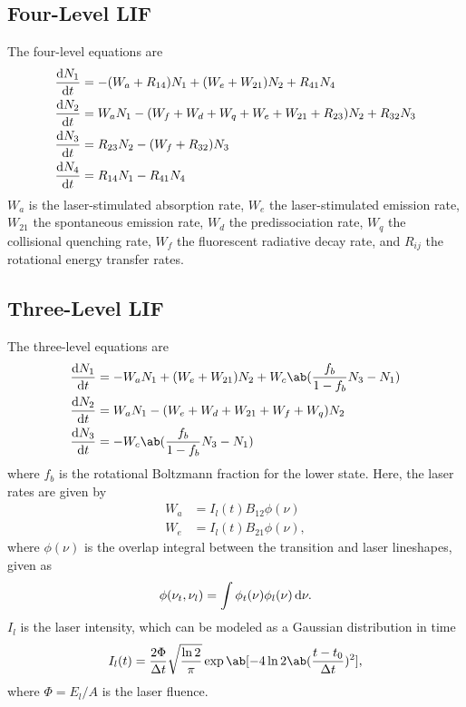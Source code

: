 \subsection{Four-Level LIF}

The four-level equations are \cite[18]{grinsteadTemperatureMeasurementHighTemperature1995}
\begin{align*}
    \odv{N_1}{t} & = -(W_a + R_{14})N_1 + (W_e + W_{21})N_2 + R_{41}N_4                      \\
    \odv{N_2}{t} & = W_aN_1 - (W_f + W_d + W_q + W_e + W_{21} + R_{23})N_2 + R_{32}N_3 \\
    \odv{N_3}{t} & = R_{23}N_2 - (W_f + R_{32})N_3                                               \\
    \odv{N_4}{t} & = R_{14}N_1 - R_{41}N_4
\end{align*}
$W_a$ is the laser-stimulated absorption rate, $W_e$ the laser-stimulated emission rate, $W_{21}$ the spontaneous emission rate, $W_d$ the predissociation rate, $W_q$ the collisional quenching rate, $W_f$ the fluorescent radiative decay rate, and $R_{ij}$ the rotational energy transfer rates.

\subsection{Three-Level LIF}

The three-level equations are \cite[2]{diskin3LevelModelSchumann1996}
\begin{align*}
    \odv{N_1}{t} & = -W_aN_1 + (W_e + W_{21})N_2 + W_c\ab(\frac{f_b}{1 - f_b}N_3 - N_1) \\
    \odv{N_2}{t} & = W_aN_1 - (W_e + W_d + W_{21} + W_f + W_q)N_2                           \\
    \odv{N_3}{t} & = -W_c\ab(\frac{f_b}{1 - f_b}N_3 - N_1)
\end{align*}
where $f_b$ is the rotational Boltzmann fraction for the lower state.
Here, the laser rates are given by
\begin{align*}
    W_a & = I_l(t)B_{12}\phi(\nu) \\
    W_e & = I_l(t)B_{21}\phi(\nu),
\end{align*}
where $\phi(\nu)$ is the overlap integral between the transition and laser lineshapes, given as
\begin{equation*}
    \phi(\nu_t, \nu_l) = \int \phi_t(\nu)\phi_l(\nu) \odif{\nu}.
\end{equation*}
$I_l$ is the laser intensity, which can be modeled as a Gaussian distribution in time
\begin{equation*}
    I_l(t) = \frac{2\Phi}{\adif{t}}\sqrt{\frac{\ln{2}}{\pi}}\exp\ab[-4\ln{2}\ab(\frac{t - t_0}{\adif{t}})^2],
\end{equation*}
where $\Phi = E_l/A$ is the laser fluence.
